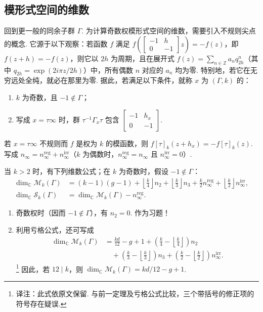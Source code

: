 \subsection{模形式空间的维数}\label{sec:modular-1-2-6}
回到更一般的同余子群 $\Gamma$. 为计算奇数权模形式空间的维数，需要引入不规则尖点的概念. 它源于以下观察：若函数 $f$ 满足 $f(\left[\begin{smallmatrix}-1&h\\0&-1\end{smallmatrix}\right]z)=-f(z)$，即 $f(z+h)=-f(z)$，则它以 $2h$ 为周期，且在展开式 $f(z)=\sum_{n\in\mathbb Z}a_nq_{2h}^n$（其中 $q_{2h}=\exp(2i\pi z/2h)$）中，所有偶数 $n$ 对应的 $a_n$ 均为零. 特别地，若它在无穷远处全纯，就必在那里为零.
据此，若满足以下条件，就称 $x$ 为 $(\Gamma,k)$ 的：
\begin{enumerate}[label=\roman*)]
\item $k$ 为奇数，且 $-1\notin\Gamma$；
\item 写成 $x=\tau\infty$ 时，群 $\tau^{-1}\Gamma_x\tau$ 包含 $\left[\begin{smallmatrix}-1&h_x\\0&-1\end{smallmatrix}\right]$.
\end{enumerate}
若 $x=\tau\infty$ 不规则而 $f$ 是权为 $k$ 的模函数，则 $f[\tau]_k(z+h_x)=-f[\tau]_k(z)$. 写成 $n_\infty=n_\infty^{\mathrm{reg}}+n_\infty^{\mathrm{irr}}$（$k$ 为偶数时，$n_\infty^{\mathrm{reg}}=n_\infty$ 且 $n_\infty^{\mathrm{irr}}=0$）.
\begin{theorem*}
当 $k>2$ 时，有下列维数公式；在 $k$ 为奇数时，假设 $-1\notin\Gamma$：
\begin{align*}
\dim_{\mathbb C}\mathcal M_k(\Gamma)&=(k-1)(g-1)+\left\lfloor\frac k4\right\rfloor n_2+\left\lfloor\frac k3\right\rfloor n_3+\frac k2n_\infty^{\mathrm{reg}}+\left\lfloor\frac k2\right\rfloor n_\infty^{\mathrm{irr}},\\
\dim_{\mathbb C}\mathcal S_k(\Gamma)&=\dim_{\mathbb C}\mathcal M_k(\Gamma)-n_\infty^{\mathrm{reg}}.
\end{align*}
\end{theorem*}
\begin{remark*}
\begin{enumerate}[label=\roman*)]
\item 奇数权时（因而 $-1\notin\Gamma$），有 $n_2=0$. 作为习题！
\item 利用亏格公式，还可写成
\begin{align*}
\dim_{\mathbb C}\mathcal M_k(\Gamma)&=\frac{kd}{12}-g+1+\left(\frac k4-\left\lfloor\frac k4\right\rfloor\right)n_2\\
&\quad+\left(\frac k3-\left\lfloor\frac k3\right\rfloor\right)n_3+\left(\frac k2-\left\lfloor\frac k2\right\rfloor\right)n_\infty^{\mathrm{irr}}.
\end{align*}
\footnote{译注：此式依原文保留. 与前一定理及亏格公式比较，三个带括号的修正项的符号存在疑误.}
因此，若 $12\mid k$，则 $\dim_{\mathbb C}\mathcal M_k(\Gamma)=kd/12-g+1$.
\end{enumerate}
\end{remark*}
